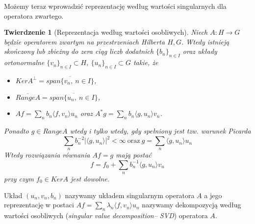 \documentclass{article}
\newtheorem{tw}{Twierdzenie}
\begin{document}
Możemy teraz wprowadzić reprezentację według wartości singularnych dla operatora zwartego.

\begin{tw}[Reprezentacja według wartości osobliwych]
Niech $A\colon H\to G$ będzie operatorem zwartym na przestrzeniach Hilberta $H,G$. Wtedy istnieją skończony lub zbieżny do zera ciąg liczb dodatnich $\{b_n\}_{n\in I}$ oraz układy ortonormalne $\{v_n\}_{n\in I}\subset H,\ \{u_n\}_{n\in I}\subset G$ takie, że
\begin{itemize}
\item $KerA^{\perp}=\overline{span\{v_n,\ n\in I\}}$,
\item $\overline{RangeA}=\overline{span\{u_n,\ n\in I\}}$,
\item $Af=\sum_nb_n\langle f, v_n\rangle u_n$ oraz $A^*g=\sum_nb_n\langle g, u_n\rangle v_n$.
\end{itemize}
Ponadto $g\in RangeA$ wtedy i tylko wtedy, gdy spełniony jest tzw. warunek Picarda
\begin{displaymath} 
\sum_nb_n^{-2}|\langle g, u_n\rangle|^2< \infty\ \textrm{oraz}\ g=\sum_n\langle g, u_n\rangle u_n
\end{displaymath}
Wtedy rozwiązania równania $Af=g$ mają postać 
\begin{displaymath}
f=f_0+\sum_nb_n^{-1}\langle g, u_n\rangle v_n
\end{displaymath}
przy czym $f_0\in KerA$ jest dowolne.
\end{tw}
Układ $(u_n,v_n,b_n)$ nazywamy układem singularnym operatora $A$ a jego reprezentację w postaci $Af=\sum_n\lambda_n\langle f,v_n\rangle u_n$ nazywamy dekompozycją według wartości osobliwych (\textit{singular value decomposition-- SVD}) operatora $A$.
\end{document}
